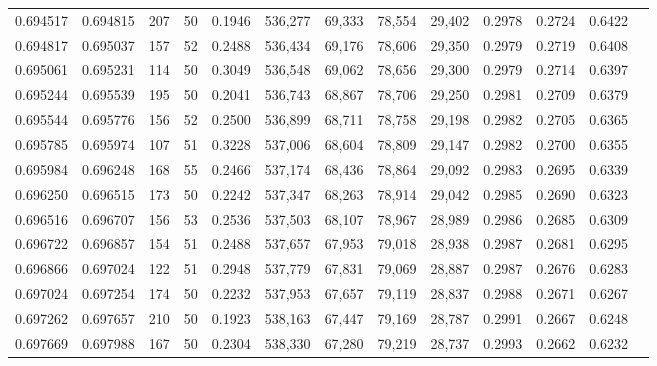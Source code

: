 \begin{tabular}{rrrrrrrrrrrrr}
0.694517 & 0.694815 &   207 &  50 &                                     0.1946 & 536,277 &  69,333 &  78,554 &  29,402 & 0.2978 & 0.2724 & 0.6422 \\
0.694817 & 0.695037 &   157 &  52 &                                     0.2488 & 536,434 &  69,176 &  78,606 &  29,350 & 0.2979 & 0.2719 & 0.6408 \\
0.695061 & 0.695231 &   114 &  50 &                                     0.3049 & 536,548 &  69,062 &  78,656 &  29,300 & 0.2979 & 0.2714 & 0.6397 \\
0.695244 & 0.695539 &   195 &  50 &                                     0.2041 & 536,743 &  68,867 &  78,706 &  29,250 & 0.2981 & 0.2709 & 0.6379 \\
0.695544 & 0.695776 &   156 &  52 &                                     0.2500 & 536,899 &  68,711 &  78,758 &  29,198 & 0.2982 & 0.2705 & 0.6365 \\
0.695785 & 0.695974 &   107 &  51 &                                     0.3228 & 537,006 &  68,604 &  78,809 &  29,147 & 0.2982 & 0.2700 & 0.6355 \\
0.695984 & 0.696248 &   168 &  55 &                                     0.2466 & 537,174 &  68,436 &  78,864 &  29,092 & 0.2983 & 0.2695 & 0.6339 \\
0.696250 & 0.696515 &   173 &  50 &                                     0.2242 & 537,347 &  68,263 &  78,914 &  29,042 & 0.2985 & 0.2690 & 0.6323 \\
0.696516 & 0.696707 &   156 &  53 &                                     0.2536 & 537,503 &  68,107 &  78,967 &  28,989 & 0.2986 & 0.2685 & 0.6309 \\
0.696722 & 0.696857 &   154 &  51 &                                     0.2488 & 537,657 &  67,953 &  79,018 &  28,938 & 0.2987 & 0.2681 & 0.6295 \\
0.696866 & 0.697024 &   122 &  51 &                                     0.2948 & 537,779 &  67,831 &  79,069 &  28,887 & 0.2987 & 0.2676 & 0.6283 \\
0.697024 & 0.697254 &   174 &  50 &                                     0.2232 & 537,953 &  67,657 &  79,119 &  28,837 & 0.2988 & 0.2671 & 0.6267 \\
0.697262 & 0.697657 &   210 &  50 &                                     0.1923 & 538,163 &  67,447 &  79,169 &  28,787 & 0.2991 & 0.2667 & 0.6248 \\
0.697669 & 0.697988 &   167 &  50 &                                     0.2304 & 538,330 &  67,280 &  79,219 &  28,737 & 0.2993 & 0.2662 & 0.6232 \\

\end{tabular}
